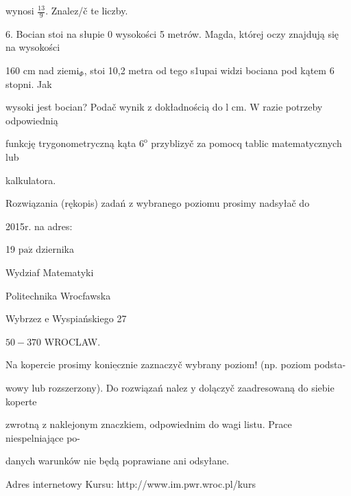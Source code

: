 \documentclass[a4paper,12pt]{article}
\begin{document}
wynosi $\displaystyle \frac{13}{9}$. Znalez/č te liczby.

6. Bocian stoi na słupie $0$ wysokości 5 metrów. Magda, której oczy znajdują się na wysokości

160 cm nad $\mathrm{z}\mathrm{i}\mathrm{e}\mathrm{m}\mathrm{i}_{\Phi}$, stoi 10,2 metra od tego s1upai widzi bociana pod kątem 6 stopni. Jak

wysoki jest bocian? Podač wynik $\mathrm{z}$ dokładnością do l cm. $\mathrm{W}$ razie potrzeby odpowiednią

funkcję trygonometryczną kąta $6^{\mathrm{o}}$ przyblizyč za pomocq tablic matematycznych lub

kalkulatora.

Rozwiązania (rękopis) zadań z wybranego poziomu prosimy nadsyłač do

2015r. na adres:

19 $\mathrm{p}\mathrm{a}\acute{\mathrm{z}}$ dziernika

Wydziaf Matematyki

Politechnika Wrocfawska

Wybrzez $\mathrm{e}$ Wyspiańskiego 27

$50-370$ WROCLAW.

Na kopercie prosimy $\underline{\mathrm{k}\mathrm{o}\mathrm{n}\mathrm{i}\mathrm{e}\mathrm{c}\mathrm{z}\mathrm{n}\mathrm{i}\mathrm{e}}$ zaznaczyč wybrany poziom! (np. poziom podsta-

wowy lub rozszerzony). Do rozwiązań nalez $\mathrm{y}$ dolączyč zaadresowaną do siebie koperte

zwrotną $\mathrm{z}$ naklejonym znaczkiem, odpowiednim do wagi listu. Prace niespelniające po-

danych warunków nie będą poprawiane ani odsyłane.

Adres internetowy Kursu: http://www.im.pwr.wroc.pl/kurs
\end{document}
